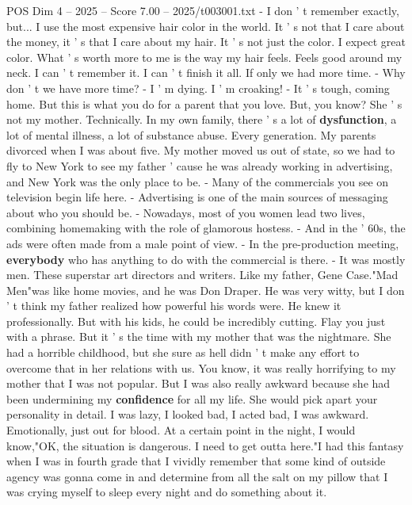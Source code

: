 \begin{textsample}{POS Dim 4 – 2025 – Score 7.00 – 2025/t003001.txt}  \label{ex:f4_pos_003}
- I don ' t remember exactly, but...
I use the most expensive hair color in the world.
It ' s not that I care about the money, it ' s that I care about my hair.
It ' s not just the color.
I expect great color.
What ' s worth more to me is the way my hair feels.
Feels good around my neck.
I can ' t remember it.
I can ' t finish it all.
If only we had more time. - Why don ' t we have more time? - I ' m dying.
I ' m croaking! - It ' s tough, coming home.
But this is what you do for a parent that you love.
But, you know?
She ' s not my mother.
Technically.
In my own family, there ' s a lot of \textbf{dysfunction}, a lot of mental illness, a lot of substance abuse.
Every generation.
My parents divorced when I was about five.
My mother moved us out of state, so we had to fly to New York to see my father ' cause he was already working in advertising, and New York was the only place to be. - Many of the commercials you see on television begin life here. - Advertising is one of the main sources of messaging about who you should be. - Nowadays, most of you women lead two lives, combining homemaking with the role of glamorous hostess. - And in the ' 60s, the ads were often made from a male point of view. - In the pre-production meeting, \textbf{everybody} who has anything to do with the commercial is there. - It was mostly men.
These superstar art directors and writers.
Like my father, Gene Case."Mad Men"was like home movies, and he was Don Draper.
He was very witty, but I don ' t think my father realized how powerful his words were.
He knew it professionally.
But with his kids, he could be incredibly cutting.
Flay you just with a phrase.
But it ' s the time with my mother that was the nightmare.
She had a horrible childhood, but she sure as hell didn ' t make any effort to overcome that in her relations with us.
You know, it was really horrifying to my mother that I was not popular.
But I was also really awkward because she had been undermining my \textbf{confidence} for all my life.
She would pick apart your personality in detail.
I was lazy, I looked bad, I acted bad, I was awkward.
Emotionally, just out for blood.
At a certain point in the night, I would know,"OK, the situation is dangerous.
I need to get outta here."I had this fantasy when I was in fourth grade that I vividly remember that some kind of outside agency was gonna come in and determine from all the salt on my pillow that I was crying myself to sleep every night and do something about it.

\end{textsample}
